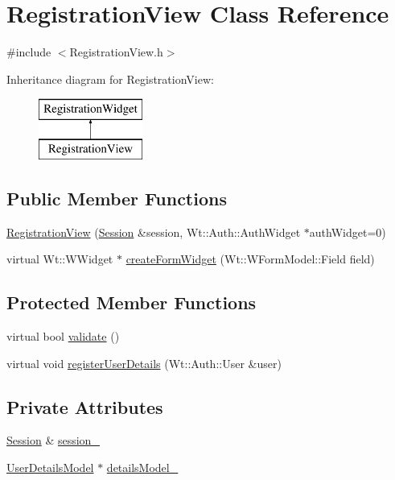\hypertarget{class_registration_view}{}\section{Registration\+View Class Reference}
\label{class_registration_view}


{\ttfamily \#include $<$Registration\+View.\+h$>$}

Inheritance diagram for Registration\+View\+:\begin{figure}[H]
\begin{center}
\leavevmode
\includegraphics[height=2.000000cm]{class_registration_view}
\end{center}
\end{figure}
\subsection*{Public Member Functions}
\begin{DoxyCompactItemize}
\item 
\hyperlink{class_registration_view_a3848c621b2e4176060293f6f80c16fa7}{Registration\+View} (\hyperlink{class_session}{Session} \&session, Wt\+::\+Auth\+::\+Auth\+Widget $\ast$auth\+Widget=0)
\item 
virtual Wt\+::\+W\+Widget $\ast$ \hyperlink{class_registration_view_ae2a0695f816ba4d0f9845b5da6539b34}{create\+Form\+Widget} (Wt\+::\+W\+Form\+Model\+::\+Field field)
\end{DoxyCompactItemize}
\subsection*{Protected Member Functions}
\begin{DoxyCompactItemize}
\item 
virtual bool \hyperlink{class_registration_view_abff4da7c898c36d81a8af6718840d27e}{validate} ()
\item 
virtual void \hyperlink{class_registration_view_a2e048b6c3103bedacd90a33f6664512b}{register\+User\+Details} (Wt\+::\+Auth\+::\+User \&user)
\end{DoxyCompactItemize}
\subsection*{Private Attributes}
\begin{DoxyCompactItemize}
\item 
\hyperlink{class_session}{Session} \& \hyperlink{class_registration_view_aef6dd993c0249d9fe34d6a32f12a4694}{session\+\_\+}
\item 
\hyperlink{class_user_details_model}{User\+Details\+Model} $\ast$ \hyperlink{class_registration_view_a95789059816b6c1cabe07b683ad51f61}{details\+Model\+\_\+}
\end{DoxyCompactItemize}


